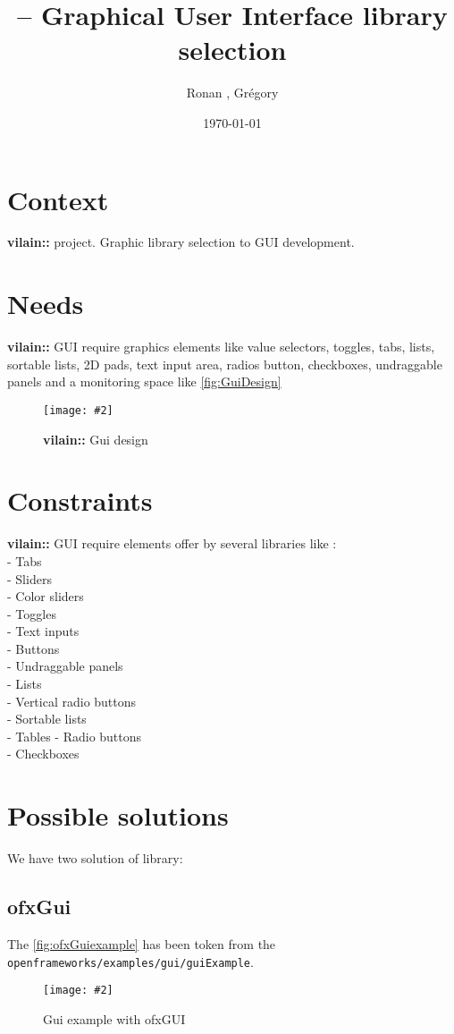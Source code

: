 \documentclass[a4paper,titlepage,oneside]{article}
\author{Ronan \bsc{Legardinier}, Grégory \bsc{David}}
\title{\vilain{} -- Graphical User Interface library selection}
\date{\today{}}
\newcommand{\image}[5][\textwidth]{%
    \begin{figure}[h]
        \centering
            \begin{minipage}[c]{#1}
                \centering
                \texttt{[image: \#2]}
                \caption{#4}
                \label{#5}
            \end{minipage}
    \end{figure}
}
\newcommand{\vilain}{\textbf{vilain::}}
\begin{document}
\maketitle{}
\tableofcontents{}
\newpage

\section{Context}
\vilain{} project. Graphic library selection to GUI development.

\section{Needs}
\vilain{} GUI require graphics elements like value selectors, toggles, tabs, lists, sortable lists, 2D pads, text input area, radios button, checkboxes, undraggable panels and a monitoring space like \figurename \vref{fig:GuiDesign}

\image{data/GUIDesign.jpg}{width=13cm}{\vilain{} Gui design}{fig:GuiDesign}

\newpage
\section{Constraints}
\vilain{} GUI require elements offer by several libraries like :\\
- Tabs\\
- Sliders\\
- Color sliders\\
- Toggles\\
- Text inputs\\
- Buttons\\
- Undraggable panels\\
- Lists\\
- Vertical radio buttons\\
- Sortable lists\\
- Tables
- Radio buttons\\
- Checkboxes\\

\section{Possible solutions}
We have two solution of library:
\subsection{ofxGui}
The \figurename \vref{fig:ofxGuiexample} has been token from the \texttt{openframeworks/examples/gui/guiExample}.
\image{data/ofxGui.jpg}{width=13cm}{Gui example with ofxGUI}{fig:ofxGuiexample}
\end{document}
